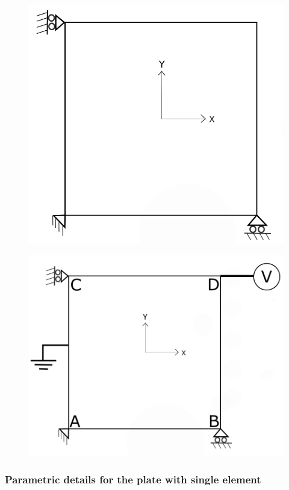 \documentclass[11pt]{article}
\begin{document}
\begin{figure}[H]
	\centering
	\begin{minipage}{.5\textwidth}
		\centering
		\includegraphics[width=0.8\linewidth]{2DPlate.png}
		\label{2Dplate}
	\end{minipage}%
	\begin{minipage}{.5\textwidth}
		\centering
		\includegraphics[width=1\linewidth]{PureElectrical.png}
		\label{PureElectrical}
	\end{minipage}
\end{figure}
\subsubsection{Parametric details for the plate with single element}
\end{document}
